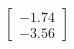 \documentclass[preview]{standalone}
\begin{document}
\begin{align*}
\begin{bmatrix} -1.74 \\ -3.56 \end{bmatrix}
\end{align*}
\end{document}
